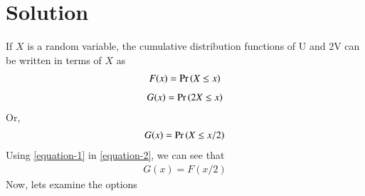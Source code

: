 \documentclass[journal,12pt,twocolumn]{IEEEtran}
\begin{document}
\section{Solution}
If $X$ is a random variable, the cumulative distribution functions of U and 2V can be written in terms of $X$ as
\begin{align} \label{equation-1}
    F(x)=\Pr\left(X \leq x\right) 
\end{align}
\begin{align}
    G(x)=\Pr\left(2X \leq x\right)
\end{align}
Or,
\begin{align} \label{equation-2}
     G(x)=\Pr\left(X \leq x/2\right)
\end{align}
Using \ref{equation-1} in \ref{equation-2}, we can see that
\begin{align} \label{equation-3}
    G(x)=F(x/2)
\end{align}
Now, lets examine the options
\end{document}
